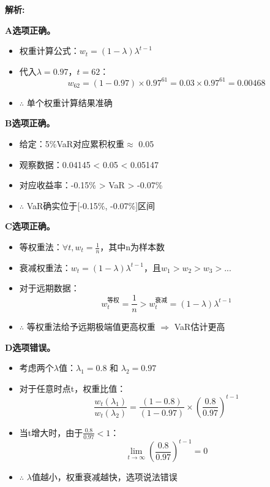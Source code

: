\documentclass{article}
\newenvironment{explanation}
{\textbf{解析:}\par}
{\par}
\begin{document}
\begin{explanation}
    \textbf{A选项正确。} 
    \begin{itemize}
        \item 权重计算公式：\(w_t = (1-\lambda)\lambda^{t-1}\)
        \item 代入\(\lambda = 0.97\)，\(t = 62\)：
        \[
        w_{62} = (1-0.97) \times 0.97^{61} = 0.03 \times 0.97^{61} = 0.00468
        \]
        \item \(\therefore\) 单个权重计算结果准确
    \end{itemize}

    \textbf{B选项正确。} 
    \begin{itemize}
        \item 给定：5\%VaR对应累积权重\(\approx\) 0.05
        \item 观察数据：0.04145 < 0.05 < 0.05147
        \item 对应收益率：-0.15\% > VaR > -0.07\%
        \item \(\therefore\) VaR确实位于[-0.15\%, -0.07\%]区间
    \end{itemize}

    \textbf{C选项正确。} 
    \begin{itemize}
        \item 等权重法：\(\forall t, w_t = \frac{1}{n}\)，其中n为样本数
        \item 衰减权重法：\(w_t = (1-\lambda)\lambda^{t-1}\)，且\(w_1 > w_2 > w_3 > ...\)
        \item 对于远期数据：
            \[
            w_t^{\text{等权}} = \frac{1}{n} > w_t^{\text{衰减}} = (1-\lambda)\lambda^{t-1}
            \]
        \item \(\therefore\) 等权重法给予远期极端值更高权重 \(\Rightarrow\) VaR估计更高
    \end{itemize}

    \textbf{D选项错误。} 
    \begin{itemize}
        \item 考虑两个\(\lambda\)值：\(\lambda_1 = 0.8\) 和 \(\lambda_2 = 0.97\)
        \item 对于任意时点t，权重比值：
        \[
        \frac{w_t(\lambda_1)}{w_t(\lambda_2)} = \frac{(1-0.8)}{(1-0.97)} \times (\frac{0.8}{0.97})^{t-1}
        \]
        \item 当t增大时，由于\(\frac{0.8}{0.97} < 1\)：
        \[
        \lim_{t \to \infty} (\frac{0.8}{0.97})^{t-1} = 0
        \]
        \item \(\therefore\) \(\lambda\)值越小，权重衰减越快，选项说法错误
    \end{itemize}
\end{explanation}
\end{document}
